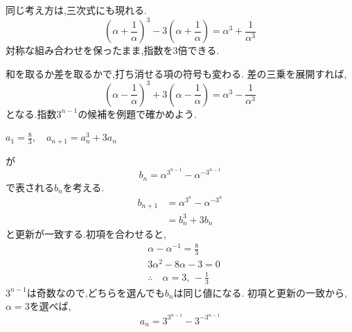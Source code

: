 同じ考え方は,三次式にも現れる.
\[
  \left(\alpha+\frac{1}{\alpha}\right)^3
  -3\left(\alpha+\frac{1}{\alpha}\right)
  =\alpha^3+\frac{1}{\alpha^3}
\]
対称な組み合わせを保ったまま,指数を3倍できる.

和を取るか差を取るかで,打ち消せる項の符号も変わる.
差の三乗を展開すれば,
\[
  \left(\alpha-\frac{1}{\alpha}\right)^3
  +3\left(\alpha-\frac{1}{\alpha}\right)
  =\alpha^3-\frac{1}{\alpha^3}
\]
となる.指数$3^{n-1}$の候補を例題で確かめよう.

\noindent{}\par\nobreak
\begin{smallquote}
  $\displaystyle a_1=\frac{8}{3},\quad a_{n+1}=a_n^3+3a_n$
\end{smallquote}
\begin{smallquote}
  が
  \[
    b_n=\alpha^{3^{n-1}}-\alpha^{-3^{n-1}}
  \]
  で表される$b_n$を考える.
  \begin{align*}
    b_{n+1}&=\alpha^{3^{n}}-\alpha^{-3^{n}}\\
    &=b_n^3+3b_n
  \end{align*}
  と更新が一致する.初項を合わせると,
  \begin{align*}
    &\alpha-\alpha^{-1}=\frac{8}{3}\\
    &3\alpha^2-8\alpha-3=0\\
    &\therefore \quad \alpha=3,\,-\frac13
  \end{align*}
  $3^{n-1}$は奇数なので,どちらを選んでも$b_n$は同じ値になる.
  初項と更新の一致から,$\alpha=3$を選べば,
  \[
    a_n=3^{3^{n-1}}-3^{-3^{n-1}}
  \]
\end{smallquote}
